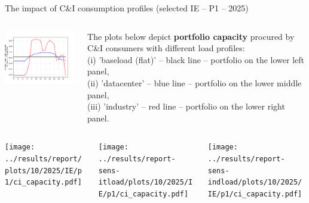 \begin{frame}{The impact of C\&I consumption profiles (selected IE -- P1 -- 2025)}


  {\footnotesize

  \begin{columns}
  \begin{column}{5cm}
  \centering
  \includegraphics[width=5.2cm]{images/profiles.png}
  \end{column}

  \begin{column}{10cm}
  \centering
  {\footnotesize
  The plots below depict {\bf portfolio capacity} procured by C\&I consumers with different load profiles: \\
  (i) 'baseload (flat)' -- black line -- portfolio on the lower left panel, \\
  (ii) 'datacenter' -- blue line -- portfolio on the lower middle panel, \\
  (iii) 'industry' -- red line -- portfolio on the lower right panel. \\
  }
  \end{column}


  \end{columns}

  \begin{columns}
    \begin{column}{5cm}
    \centering
    \texttt{[image: ../results/report/plots/10/2025/IE/p1/ci\_capacity.pdf]}
    \end{column}
  
    \begin{column}{5cm}
    \centering
    \texttt{[image: ../results/report-sens-itload/plots/10/2025/IE/p1/ci\_capacity.pdf]}
    \end{column}
  
    \begin{column}{5cm}
    \centering
    \texttt{[image: ../results/report-sens-indload/plots/10/2025/IE/p1/ci\_capacity.pdf]}
    \end{column}

  \end{columns}

  }


\end{frame}



